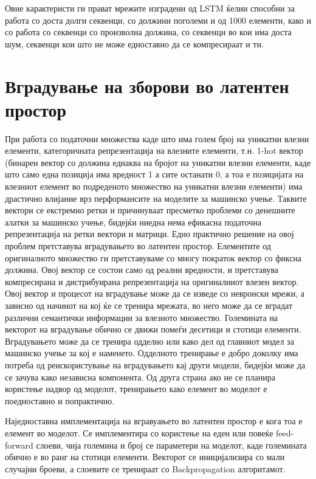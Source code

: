 Овие карактеристи ги прават мрежите изградени од LSTM ќелии способни за работа со доста долги секвенци, со должини поголеми и од 1000 елементи, како и со работа со секвенци со произволна должина, со секвенци во кои има доста шум, секвенци кои што не може едноставно да се компресираат и тн.

\section{Вградување на зборови во латентен простор}

При работа со податочни множества каде што има голем број на уникатни влезни елементи, категоричната репрезентација на влезните елементи, т.н. 1-hot вектор (бинарен вектор со должина еднаква на бројот на уникатни влезни елементи, каде што само една позиција има вредност 1 а сите останати 0, а тоа е позицијата на влезниот елемент во подреденото множество на уникатни влезни елементи) има драстично влијание врз перформансите на моделите за машинско учење. Таквите вектори се екстремно ретки и причинуваат пресметко проблеми со денешните алатки за машинско учење, бидејќи ниедна нема ефикасна податочна репрезентација на ретки вектори и матрици. 
Едно практично решение на овој проблем претставува вградувањето во латентен простор. Елементите од оригиналното множество ги претставуваме со многу пократок вектор со фиксна должина. Овој вектор се состои само од реални вредности, и претставува компресирана и дистрибуирана репрезентација на оригиналниот влезен вектор. Овој вектор и процесот на вградување може да се изведе со невронски мрежи, а зависно од начинот на кој ќе се тренира мрежата, во него може да се вградат различни семантички информации за влезното множество. Големината на векторот на вградување обично се движи помеѓи десетици и стотици елементи.
Вградувањето може да се тренира одделно или како дел од главниот модел за машинско учење за кој е наменето. Одделното тренирање е добро доколку има потреба од реискористување на вградувањето кај други модели, бидејќи може да се зачува како независна компонента. Од друга страна ако не се планира користење надвор од моделот, тренирањето како елемент во моделот е поедноставно и попрактично.

Наједноставна имплементација на вгравуањето во латентен простор е кога тоа е елемент во моделот. Се имплементира со користење на еден или повеќе feed-forward слоеви, чија големина и број се параметери на моделот, каде големината обично е во ранг на стотици елементи. Векторот се иницијализира со мали случајни броеви, а слоевите се тренираат со Backpropagation алгоритамот.

